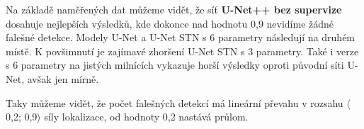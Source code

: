 Na základě naměřených dat můžeme vidět, že síť \textbf{U-Net++ bez supervize} dosahuje nejlepších výsledků, kde dokonce nad hodnotu 0,9 nevidíme žádné falešné detekce. Modely U-Net a U-Net STN s 6 parametry následují na druhém místě.  K povšimnutí je zajímavé zhoršení U-Net STN s 3 parametry. Také i verze s 6 parametry na jistých milnících vykazuje horší výsledky oproti původní síti U-Net, avšak jen mírně.

Taky můžeme vidět, že počet falešných detekcí má lineární převahu v rozsahu $\langle$0,2; 0,9$\rangle$ síly lokalizace, od hodnoty 0,2 nastává průlom.
\endinput
